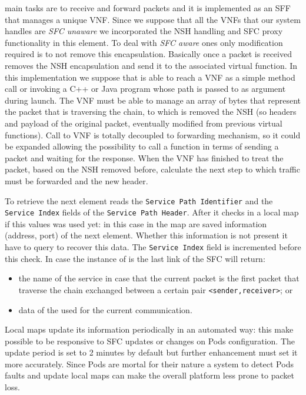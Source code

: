 \astaire{} main tasks are to receive and forward packets and it is implemented
as an SFF that manages a unique VNF. Since we suppose that all the VNFs that our
system handles are \emph{SFC unaware} we incorporated the NSH handling and SFC
proxy functionality in this element. To deal with \emph{SFC aware} ones only
modification required is to not remove this encapsulation. Basically once a
packet is received \astaire{} removes the NSH encapsulation and send it to the
associated
virtual function. In this implementation we suppose that \astaire{} is able to
reach a VNF as a
simple method call or invoking a C++ or Java program whose path is passed to 
\astaire{} as argument during launch. The VNF must be able to manage an array of
bytes that represent the packet that is traversing the chain, to which is
removed the NSH (so headers and payload of the original packet, eventually
modified from previous virtual functions). Call to VNF is totally decoupled
to forwarding mechanism, so it could be expanded allowing the possibility to
call a function in terms of sending a packet and waiting for the response. When
the VNF has finished to treat the packet, based on the NSH removed before,
calculate the next step to which traffic must be forwarded and the new header.

To retrieve the next element \astaire{} reads the \texttt{Service Path
Identifier} and the \texttt{Service Index} fields of the \texttt{Service Path
Header}. After it checks in a local map if this values was used yet: in this
case in the map are saved information (address, port) of the next element.
Whether this information is not present it have to query \roulette{} to recover
this data. The \texttt{Service Index} field is incremented before this check. In
case the instance of \astaire{} is the last link of the SFC \roulette{} will
return:
\begin{itemize}
  \item the name of the \egress{} service in case that the current packet is the
  first packet that traverse the chain exchanged between a certain pair
  \verb!<sender,receiver>!; or
  \item data of the \egress{} used for the current communication.
\end{itemize}
Local maps update its information periodically in an automated way: this make
possible to be responsive to SFC updates or changes on Pods configuration. The
update period is set to 2 minutes by default but further enhancement must set it
more accurately. Since Pods are mortal for their nature a system to detect
Pods faults and update local maps can make the overall platform less prone to
packet loss.


